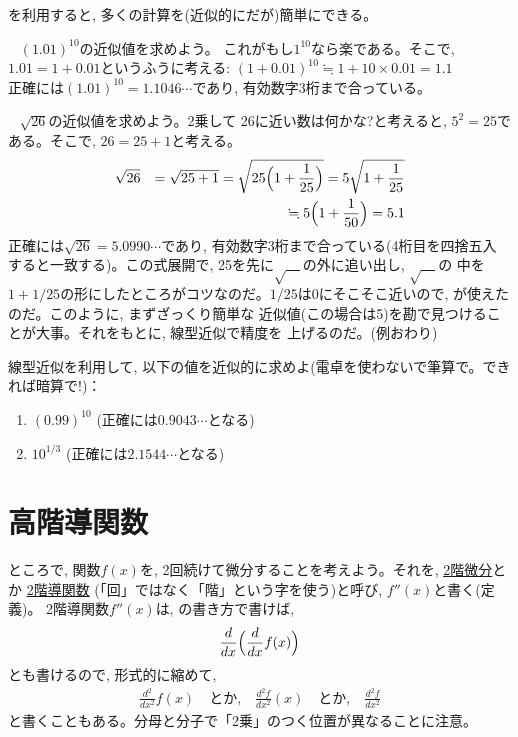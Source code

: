 を利用すると, 多くの計算を(近似的にだが)簡単にできる。\mv

\begin{exmpl} $\,\,\,\,\,(1.01)^{10}$の近似値を求めよう。
これがもし$1^{10}$なら楽である。そこで, $1.01=1+0.01$というふうに考える: 
$(1+0.01)^{10} \fallingdotseq 1+10\times0.01 = 1.1$\\
正確には$(1.01)^{10}=1.1046\cdots$であり, 有効数字3桁まで合っている。
\end{exmpl}

\begin{exmpl} $\,\,\,\,\,\sqrt{26}$の近似値を求めよう。2乗して
26に近い数は何かな?と考えると, $5^2=25$である。そこで, 
$26=25+1$と考える。
\begin{eqnarray*}
\sqrt{26}&&=\sqrt{25+1}=\sqrt{25\Bigl(1+\frac{1}{25}\Bigr)}=5\sqrt{1+\frac{1}{25}}\\
&&\fallingdotseq5\Bigl(1+\frac{1}{50}\Bigr)=5.1
\end{eqnarray*}
正確には$\sqrt{26}=5.0990\cdots$であり, 有効数字3桁まで合っている(4桁目を四捨五入
すると一致する)。この式展開で, 25を先に$\sqrt{\quad}$の外に追い出し, $\sqrt{\quad}$の
中を$1+1/25$の形にしたところがコツなのだ。$1/25$は0にそこそこ近いので, 
が使えたのだ。このように, まずざっくり簡単な
近似値(この場合は5)を勘で見つけることが大事。それをもとに, 線型近似で精度を
上げるのだ。(例おわり)\end{exmpl}
\mv

\begin{q}\label{q:univ_lin_approx4} 線型近似を利用して, 以下の値を近似的に求めよ(電卓を使わないで筆算で。できれば暗算で!)：
\begin{enumerate}
\item $(0.99)^{10}$ (正確には$0.9043\cdots$となる)
\item $10^{1/3}$ (正確には$2.1544\cdots$となる)
\end{enumerate}\end{q}
\mv


\section{高階導関数}

ところで, 関数$f(x)$を, 2回続けて微分することを考えよう。それを, \underline{2階微分}とか
\underline{2階導関数} (「回」ではなく「階」という字を使う)と呼び, $f''(x)$と書く(定義)。
2階導関数$f''(x)$は, の書き方で書けば, 
\begin{eqnarray}
\frac{d}{dx}\Bigl(\frac{d}{dx}f(x)\Bigr)
\end{eqnarray}
とも書けるので, 形式的に縮めて, 
\begin{eqnarray*}
\frac{d^2}{dx^2}f(x)\quad\text{とか,}\quad 
\frac{d^2f}{dx^2}(x)\quad\text{とか,}\quad 
\frac{d^2f}{dx^2}
\end{eqnarray*}
と書くこともある。分母と分子で「2乗」のつく位置が異なることに注意。

